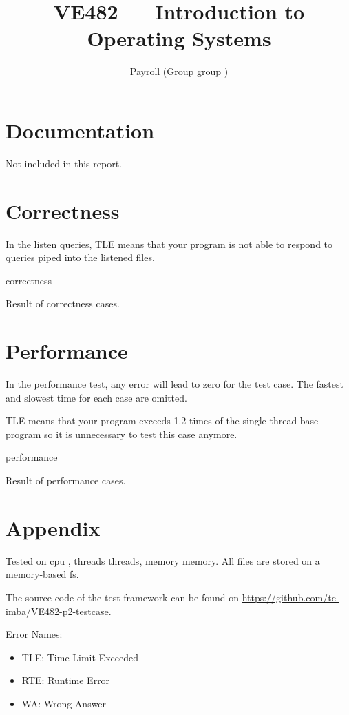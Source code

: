 \documentclass[landscape]{article}
\title{VE482 --- Introduction to\\ Operating Systems}
\subtitle{Payroll (Group {{ group }})}
\begin{document}
\maketitle

\section{Documentation}

Not included in this report.

\section{Correctness}

In the listen queries, {\color{red}TLE} means that your program is not able to respond to queries piped into the listened files.

\begin{table}[!htbp]
\centering
{{ correctness }}
\caption{Result of correctness cases.}
\end{table}

\newpage

\section{Performance}

In the performance test, any error will lead to zero for the test case. The fastest and slowest time for each case are omitted.

{\color{red}TLE} means that your program exceeds 1.2 times of the single thread base program so it is unnecessary to test this case anymore.

\begin{table}[!htbp]
\centering
{{ performance }}
\caption{Result of performance cases.}
\end{table}

\section*{Appendix}

Tested on {{ cpu }}, {{ threads }} threads, {{ memory }} memory. All files are stored on a memory-based fs.

The source code of the test framework can be found on \url{https://github.com/tc-imba/VE482-p2-testcase}. \bigskip

Error Names:
\begin{itemize}
\item {\color{red}TLE}: Time Limit Exceeded
\item {\color{red}RTE}: Runtime Error
\item {\color{red}WA}: Wrong Answer
\end{itemize}
	
\end{document}
